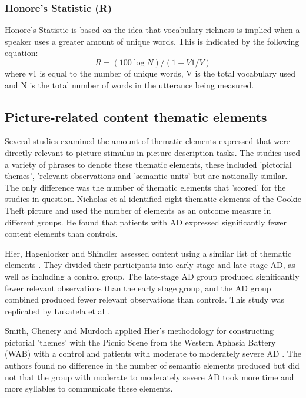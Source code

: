 \documentclass[10pt, letterpaper, twoside, openany]{book}
\begin{document}
\subsubsection{Honore's Statistic (R)}
Honore's Statistic is based on the idea that vocabulary richness is implied when a speaker uses a greater amount of unique words. This is indicated by the following equation:
\begin{equation} \label{x4}
R = (100 \log N) / (1 - V1/V)
\end{equation}
where v1 is equal to the number of unique words, V is the total vocabulary used and N is the total number of words in the utterance being measured.
\subsection{Picture-related content thematic elements}
Several studies examined the amount of thematic elements expressed that were directly relevant to picture stimulus in picture description tasks. The studies used a variety of phrases to denote these thematic elements, these included 'pictorial themes', 'relevant observations and 'semantic units' but are notionally similar. The only difference was the number of thematic elements that 'scored' for the studies in question. Nicholas et al identified eight thematic elements of the Cookie Theft picture and used the number of elements as an outcome measure in different groups. He found that patients with AD expressed significantly fewer content elements than controls.
\par
Hier, Hagenlocker and Shindler assessed content using a similar list of thematic elements \cite{Hier1985}. They divided their participants into early-stage and late-stage AD, as well as including a control group. The late-stage AD group produced significantly fewer relevant observations than the early stage group, and the AD group combined produced fewer relevant observations than controls. This study was replicated by Lukatela et al \cite{Lukatela1998}.
\par
Smith, Chenery and Murdoch applied Hier's methodology for constructing pictorial 'themes' with the Picnic Scene from the Western Aphasia Battery (WAB) with a control and patients with moderate to moderately severe AD \cite{Smith1989}. The authors found no difference in the number of semantic elements produced but did not that the group with moderate to moderately severe AD took more time and more syllables to communicate these elements.
\par
\end{document}

